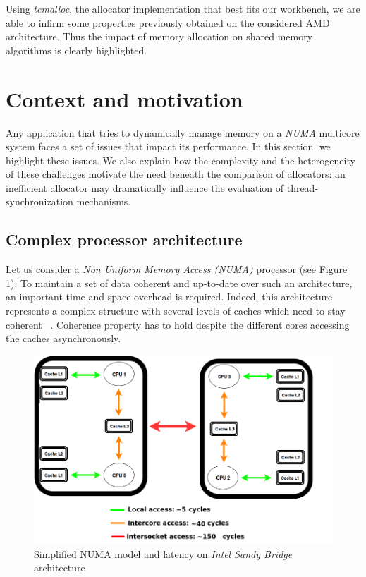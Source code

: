\documentclass[10pt]{article}											%
\begin{document}
Using \textit{tcmalloc}, the allocator implementation that best fits our workbench, we are able to infirm some properties previously obtained on the considered AMD architecture.   Thus the impact of memory allocation on shared memory algorithms is clearly highlighted.



\section{Context and motivation}
Any application that tries to dynamically manage memory on a \emph{NUMA} multicore system faces a set of issues that impact its performance.   In this section, we highlight these issues.   We also explain how the complexity and the heterogeneity of these challenges motivate the need beneath the comparison of allocators: an inefficient allocator may dramatically influence the evaluation of thread-synchronization mechanisms.



\subsection{Complex processor architecture}
Let us consider a \textit{Non Uniform Memory Access (NUMA)} processor (see Figure \ref{globalNumaArchitecture.png}).   To maintain a set of data coherent and up-to-date over such an architecture, an important time and space overhead is required.   Indeed, this architecture represents a complex structure with several levels of caches which need to stay coherent ~\cite{cacheCoherence_sorin}.   Coherence property has to hold despite the different cores accessing the caches asynchronously.\\

	\begin{figure}
		\includegraphics[width=1.0\linewidth]{charts/numaNode.png}
		\caption{Simplified NUMA model and latency on \textit{Intel Sandy Bridge} architecture}
        \label{globalNumaArchitecture.png}
	\end{figure}
\end{document}
